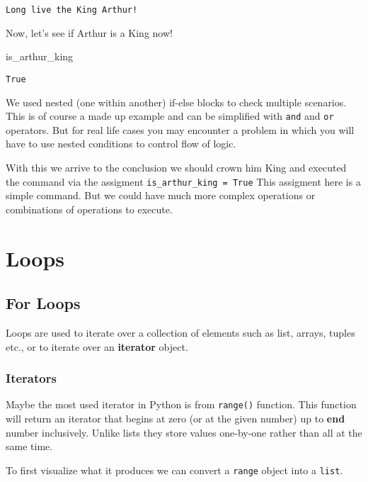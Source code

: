 \documentclass[
  letterpaper,
  DIV=11,
  numbers=noendperiod]{scrreprt}
\newenvironment{Shaded}{\begin{snugshade}}{\end{snugshade}}
\newcommand{\NormalTok}[1]{\textcolor[rgb]{0.00,0.23,0.31}{#1}}
\begin{document}
\begin{verbatim}
Long live the King Arthur!
\end{verbatim}

Now, let's see if Arthur is a King now!

\begin{Shaded}
\begin{Highlighting}[]
\NormalTok{is\_arthur\_king}
\end{Highlighting}
\end{Shaded}

\begin{verbatim}
True
\end{verbatim}

We used nested (one within another) if-else blocks to check multiple
scenarios. This is of course a made up example and can be simplified
with \texttt{and} and \texttt{or} operators. But for real life cases you
may encounter a problem in which you will have to use nested conditions
to control flow of logic.

With this we arrive to the conclusion we should crown him King and
executed the command via the assigment
\texttt{is\_arthur\_king\ =\ True} This assigment here is a simple
command. But we could have much more complex operations or combinations
of operations to execute.

\part{Loops}

\chapter{For Loops}\label{for-loops}

Loops are used to iterate over a collection of elements such as list,
arrays, tuples etc., or to iterate over an \textbf{iterator} object.

\section{Iterators}\label{iterators}

Maybe the most used iterator in Python is from \texttt{range()}
function. This function will return an iterator that begins at zero (or
at the given number) up to \textbf{end} number inclusively. Unlike lists
they store values one-by-one rather than all at the same time.

To first visualize what it produces we can convert a \texttt{range}
object into a \texttt{list}.
\end{document}
